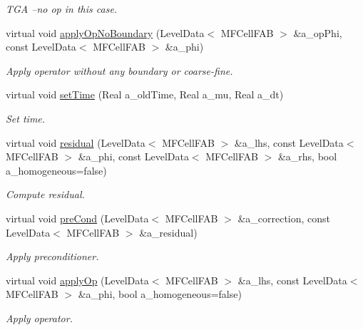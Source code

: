 \begin{DoxyCompactItemize}
\begin{DoxyCompactList}\small\item\em T\+GA --no op in this case. \end{DoxyCompactList}\item 
virtual void \hyperlink{classmfconductivityop_a6e582938533b06d6ecaf1965b5711ca6}{apply\+Op\+No\+Boundary} (Level\+Data$<$ M\+F\+Cell\+F\+AB $>$ \&a\+\_\+op\+Phi, const Level\+Data$<$ M\+F\+Cell\+F\+AB $>$ \&a\+\_\+phi)
\begin{DoxyCompactList}\small\item\em Apply operator without any boundary or coarse-\/fine. \end{DoxyCompactList}\item 
virtual void \hyperlink{classmfconductivityop_a9dc314dfd0ac90659b70bf547625884b}{set\+Time} (Real a\+\_\+old\+Time, Real a\+\_\+mu, Real a\+\_\+dt)
\begin{DoxyCompactList}\small\item\em Set time. \end{DoxyCompactList}\item 
virtual void \hyperlink{classmfconductivityop_a051a1dbcb5df4acaf3dc9a33bc545f9d}{residual} (Level\+Data$<$ M\+F\+Cell\+F\+AB $>$ \&a\+\_\+lhs, const Level\+Data$<$ M\+F\+Cell\+F\+AB $>$ \&a\+\_\+phi, const Level\+Data$<$ M\+F\+Cell\+F\+AB $>$ \&a\+\_\+rhs, bool a\+\_\+homogeneous=false)
\begin{DoxyCompactList}\small\item\em Compute residual. \end{DoxyCompactList}\item 
virtual void \hyperlink{classmfconductivityop_acc3cdc7631b4a1126cc45164bc28e483}{pre\+Cond} (Level\+Data$<$ M\+F\+Cell\+F\+AB $>$ \&a\+\_\+correction, const Level\+Data$<$ M\+F\+Cell\+F\+AB $>$ \&a\+\_\+residual)
\begin{DoxyCompactList}\small\item\em Apply preconditioner. \end{DoxyCompactList}\item 
virtual void \hyperlink{classmfconductivityop_a20452a0c868c256b15704d90c5162508}{apply\+Op} (Level\+Data$<$ M\+F\+Cell\+F\+AB $>$ \&a\+\_\+lhs, const Level\+Data$<$ M\+F\+Cell\+F\+AB $>$ \&a\+\_\+phi, bool a\+\_\+homogeneous=false)
\begin{DoxyCompactList}\small\item\em Apply operator. \end{DoxyCompactList}\item 

\end{DoxyCompactItemize}
